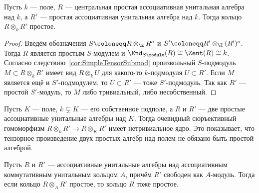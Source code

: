 \documentclass[
	extrafontsizes,
	11pt,
	hyphens,
]{memoir}
\begin{document}
\begin{theorem}
Пусть \(k\) --- поле, \(R\) --- центральная простая ассоциативная унитальная алгебра над \(k\), а \(R'\) --- простая ассоциативная унитальная алгебра над \(k\).
\label{thm:TensProdCentSimpAndSimp}
Тогда кольцо \(R \otimes_k R'\) простое.
\end{theorem}

\begin{proof}
Введём обозначения \(S \coloneqq R \otimes_{\Z} R^o\) и \(S' \coloneqq R' \otimes_{\Z} (R')^o\).
Тогда \(R\) является простым \(S\)-модулем и \(\End_{S\module}(R) \cong \Zent(R) \cong k\).
Согласно следствию~\ref{cor:SimpleTensorSubmod} произвольный \(S\)-под\-мо\-дуль \(M \subset R \otimes_k R'\) имеет вид \(R \otimes_k U\) для какого-то \(k\)-под\-мо\-ду\-ля \(U \subset R'\).
Если \(M\) является ещё и \(S'\)-под\-мо\-ду\-лем, то \(U \subset R'\) --- тоже \(S'\)-под\-мо\-дуль. Так как \(R'\) --- простой \(S'\)-мо\-дуль, то \(M\) либо тривиальный, либо несобственный.
\end{proof}


\begin{example}
Пусть \(K\) --- поле, \(k \varsubsetneq K\) --- его собственное подполе, а \(R\) и \(R'\) --- две простые ассоциативные унитальные алгебры над \(K\).
Тогда очевидный сюръективный гомоморфизм \(R \otimes_k R' \to R \otimes_K R'\) имеет нетривиальное ядро. Это показывает, что тензорное произведение двух простых алгебр над полем не обязано быть простой алгеброй.
\end{example}


\begin{theorem}
Пусть \(R\) и \(R'\) --- ассоциативные унитальные алгебры над ассоциативным коммутативным унитальным кольцом \(A\), причём \(R'\) свободен как \(A\)-мо\-дуль.
Тогда если кольцо \(R \otimes_A R'\) простое, то кольцо \(R\) тоже простое.
\end{theorem}
\end{document}
